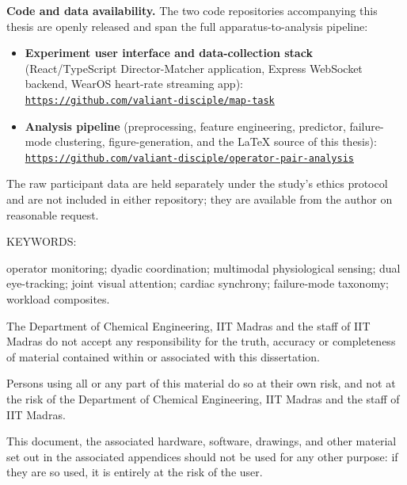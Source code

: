 \documentclass[BTech]{iitmdiss}
\begin{document}
\vspace*{0.4in}
\noindent\textbf{Code and data availability.} The two code repositories accompanying this thesis are openly released and span the full apparatus-to-analysis pipeline:

\begin{itemize}
\item \textbf{Experiment user interface and data-collection stack} (React/TypeScript Director-Matcher application, Express WebSocket backend, WearOS heart-rate streaming app):\\
\texttt{\href{https://github.com/valiant-disciple/map-task}{https://github.com/valiant-disciple/map-task}}
\item \textbf{Analysis pipeline} (preprocessing, feature engineering, predictor, failure-mode clustering, figure-generation, and the LaTeX source of this thesis):\\
\texttt{\href{https://github.com/valiant-disciple/operator-pair-analysis}{https://github.com/valiant-disciple/operator-pair-analysis}}
\end{itemize}

\noindent The raw participant data are held separately under the study's ethics protocol and are not included in either repository; they are available from the author on reasonable request.

\abstract
\noindent KEYWORDS: \hspace*{0.5em} \parbox[t]{4.4in}{operator monitoring; dyadic coordination; multimodal physiological sensing; dual eye-tracking; joint visual attention; cardiac synchrony; failure-mode taxonomy; workload composites.}

\vspace*{24pt}
\noindent


\pagebreak

\disclaimer
The Department of Chemical Engineering, IIT Madras and the staff of IIT Madras do not accept any responsibility for the truth, accuracy or completeness of material contained within or associated with this dissertation.

Persons using all or any part of this material do so at their own risk, and not at the risk of the Department of Chemical Engineering, IIT Madras and the staff of IIT Madras.

This document, the associated hardware, software, drawings, and other material set out in the associated appendices should not be used for any other purpose: if they are so used, it is entirely at the risk of the user.
\end{document}
